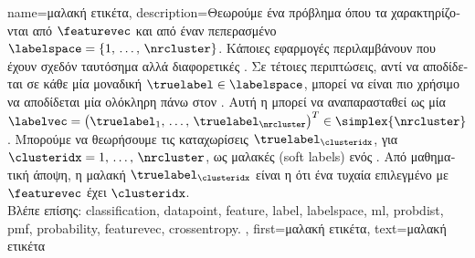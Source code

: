 {name={\foreignlanguage{greek}{μαλακή ετικέτα}},
	description={\foreignlanguage{greek}{Θεωρούμε ένα πρόβλημα}  
		\foreignlanguage{greek}{όπου τα}  \foreignlanguage{greek}{χαρακτηρίζονται από}  $\featurevec$ 
		\foreignlanguage{greek}{και}  \foreignlanguage{greek}{από έναν πεπερασμένο}  
		$\labelspace = \{1,\,\ldots,\,\nrcluster\}$. \foreignlanguage{greek}{Κάποιες εφαρμογές}  \foreignlanguage{greek}{περιλαμβάνουν} 
		 \foreignlanguage{greek}{που έχουν σχεδόν ταυτόσημα}  \foreignlanguage{greek}{αλλά διαφορετικές} 
		. \foreignlanguage{greek}{Σε τέτοιες περιπτώσεις, αντί να αποδίδεται σε κάθε}  
		\foreignlanguage{greek}{μία μοναδική}  $\truelabel \in \labelspace$, \foreignlanguage{greek}{μπορεί να είναι πιο χρήσιμο 
		να αποδίδεται μία ολόκληρη}  \foreignlanguage{greek}{πάνω στον} . 
		\foreignlanguage{greek}{Αυτή η}  \foreignlanguage{greek}{μπορεί να αναπαρασταθεί ως μία}  
		$\labelvec = \big( \truelabel_{1},\,\ldots,\,\truelabel_{\nrcluster}\big)^{T} \in \simplex{\nrcluster}$. \foreignlanguage{greek}{Μπορούμε να 
		θεωρήσουμε τις καταχωρίσεις $\truelabel_{\clusteridx}$, για $\clusteridx=1,\,\ldots,\,\nrcluster$, 
		ως μαλακές}  (soft labels) \foreignlanguage{greek}{ενός} . \foreignlanguage{greek}{Από μαθηματική 
		άποψη, η μαλακή}  $\truelabel_{\clusteridx}$ \foreignlanguage{greek}{είναι η}  \foreignlanguage{greek}{ότι 
		ένα τυχαία επιλεγμένο}  \foreignlanguage{greek}{με}  $\featurevec$ \foreignlanguage{greek}{έχει}
		 $\clusteridx$.
		\\
              	\foreignlanguage{greek}{Βλέπε επίσης:} \gls{classification}, \gls{datapoint}, \gls{feature}, \gls{label}, \gls{labelspace}, \gls{ml}, \gls{probdist}, 
		\gls{pmf}, \gls{probability}, \gls{featurevec}, \gls{crossentropy}. },
 	first={\foreignlanguage{greek}{μαλακή ετικέτα}},
 	text={\foreignlanguage{greek}{μαλακή ετικέτα}}
}

